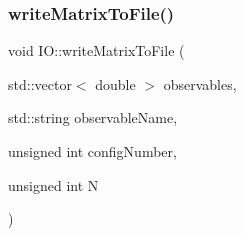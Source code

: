 \mbox{\label{namespace_i_o_ad77b7dd770afc8e2eb433d6187ea3616}} 
\subsubsection{\texorpdfstring{writeMatrixToFile()}{writeMatrixToFile()}}
{\footnotesize\ttfamily void I\+O\+::write\+Matrix\+To\+File (\begin{DoxyParamCaption}\item[{std\+::vector$<$ double $>$}]{observables,  }\item[{std\+::string}]{observable\+Name,  }\item[{unsigned int}]{config\+Number,  }\item[{unsigned int}]{N }\end{DoxyParamCaption})}

